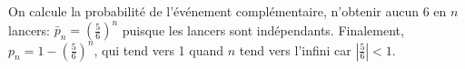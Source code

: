 On calcule la probabilité de l'événement complémentaire, n'obtenir aucun 6 en $n$ lancers: $\bar{p}_n=\left(\frac{5}{6}\right)^n$ puisque les lancers sont indépendants. Finalement, $p_n=1-\left(\frac{5}{6}\right)^n$, qui tend vers 1 quand $n$ tend vers l’infini car $\left|\frac{5}{6} \right|<1$.

